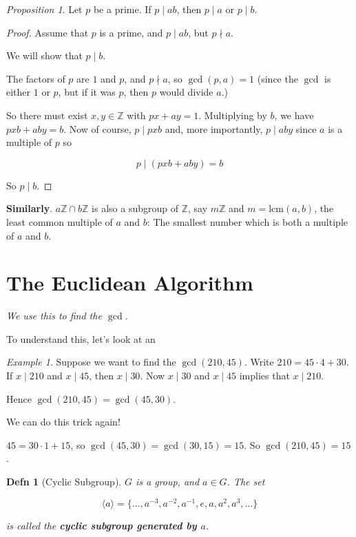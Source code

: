 \documentclass[12pt]{article}
\def\lcm{\text{lcm}}
\def\Z{{\mathbb Z}}
\newtheorem{definition}{Defn}
\theoremstyle{remark}
\newtheorem{proposition}{Proposition}
\theoremstyle{remark}
\theoremstyle{remark}
\newtheorem{example}{Example}
\theoremstyle{remark}
\theoremstyle{remark}
\begin{document}
\begin{proposition}
  Let $p$ be a prime. If $p \mid ab$, then $p \mid a$ or $p \mid b$.
\end{proposition}

\begin{proof}
  Assume that $p$ is a prime, and $p \mid ab$, but $p \nmid a$.

  We will show that $p \mid b$.

  The factors of $p$ are $1$ and $p$, and $p \nmid a$, so $\gcd(p, a) = 1$ (since
  the $\gcd$ is either $1$ or $p$, but if it was $p$, then $p$ would divide $a$.)

  So there must exist $x, y \in \Z$ with $px + ay = 1$. Multiplying by $b$, we
  have $pxb + aby = b$. Now of course, $p \mid pxb$ and, more importantly, $p \mid aby$
  since $a$ is a multiple of $p$ so

  \[
    p \mid (pxb + aby) = b
  \]

  So $p \mid b$.
\end{proof}

{\bf Similarly}. $a\Z \cap b\Z$ is also a subgroup of $\Z$, say $m\Z$ and $m = \lcm(a, b)$, the
least common multiple of $a$ and $b$: The smallest number which is both a
multiple of $a$ and $b$.

\section{The Euclidean Algorithm}
{\it We use this to find the $\gcd$}.

To understand this, let's look at an

\begin{example}
	Suppose we want to find the $\gcd(210, 45)$. Write $210 = 45 \cdot 4 + 30$. If
	$x \mid 210$ and $x \mid 45$, then $x \mid 30$. Now $x \mid 30$ and $x \mid 45$ implies that
	$x \mid 210$.

	Hence $\gcd(210, 45) = \gcd(45, 30)$.

	We can do this trick again!

	$45 = 30 \cdot 1 + 15$, so $\gcd(45, 30) = \gcd(30, 15) = 15$. So $\gcd(210, 45) = 15$.
\end{example}

\begin{definition}[Cyclic Subgroup]
  $G$ is a group, and $a \in G$. The set

  \[
    \langle a \rangle = \{\dots, a^{-3}, a^{-2}, a^{-1}, e, a, a^2, a^3, \dots\}
  \]

  is called the {\bf cyclic subgroup generated by $a$}.
\end{definition}
\end{document}
